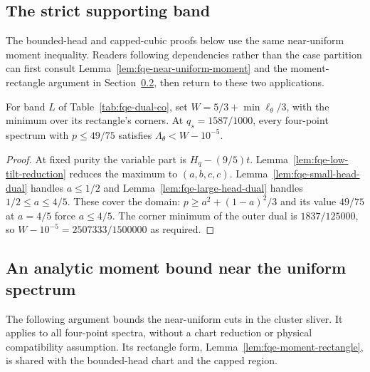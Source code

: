 \subsection{The strict supporting band}\label{sec:fqe-rational-dual}
The bounded-head and capped-cubic proofs below use the same near-uniform
moment inequality. Readers following dependencies rather than the
case partition can first consult
Lemma~\ref{lem:fqe-near-uniform-moment} and the moment-rectangle argument
in Section~\ref{sec:sup-nu-moment}, then return to these two applications.
\begin{lemma}
\label{lem:fqe-rational-dual}
For band $L$ of Table~\ref{tab:fqe-dual-co}, set
$W=5/3+\min\ell_\theta/3$, with the minimum over its rectangle's corners.
At $q_s=1587/1000$, every four-point spectrum with $p\le49/75$ satisfies
$\Lambda_\theta<W-10^{-5}$.
\end{lemma}
\begin{proof}
At fixed purity the variable part is $H_q-(9/5)t$.
Lemma~\ref{lem:fqe-low-tilt-reduction} reduces the maximum to $(a,b,c,c)$.
Lemma~\ref{lem:fqe-small-head-dual} handles $a\le1/2$ and
Lemma~\ref{lem:fqe-large-head-dual} handles $1/2\le a\le4/5$.
These cover the domain: $p\ge a^2+(1-a)^2/3$ and its value $49/75$ at $a=4/5$
force $a\le4/5$. The corner minimum of the outer dual is $1837/125000$,
so $W-10^{-5}=2507333/1500000$ as required.
\end{proof}








\subsection{An analytic moment bound near the uniform spectrum}\label{sec:sup-nu-moment}
The following argument bounds the near-uniform cuts in the cluster sliver. It applies to all four-point
spectra, without a chart reduction or physical compatibility assumption. Its rectangle form,
Lemma~\ref{lem:fqe-moment-rectangle}, is shared with the bounded-head chart and the capped region.

